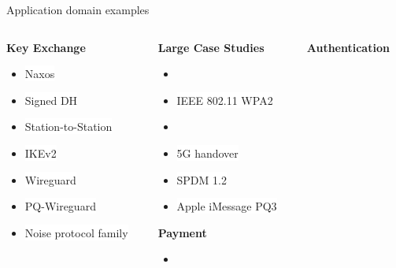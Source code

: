 \documentclass[11pt,aspectratio=169]{beamer}
\begin{document}
\begin{frame}[fragile]{Application domain examples}
    \begin{columns}
        \begin{column}{0.36\textwidth}
            \textbf{Key Exchange}
            \begin{itemize}
                \item \colorbox{white}{Naxos}
                \item \colorbox{white}{Signed DH}
                \item \colorbox{white}{Station-to-Station}
                \item \colorbox{white}{IKEv2}
                \item \colorbox{white}{Wireguard}
                \item \colorbox{white}{PQ-Wireguard}
                \item \colorbox{white}{Noise protocol family}
            \end{itemize}
        \end{column}
        \begin{column}{0.36\textwidth}
            \textbf{Large Case Studies}
            \begin{itemize}
                \item {}
                \item \colorbox{white}{IEEE 802.11 WPA2}
                \item {}
                \item \colorbox{white}{5G handover}
                \item \colorbox{white}{SPDM 1.2}
                \item \colorbox{white}{Apple iMessage PQ3}
            \end{itemize}
            \textbf{Payment}
            \begin{itemize}
                \item {}
            \end{itemize}
        \end{column}
        \begin{column}{0.3\textwidth}
            \textbf{Authentication}
            \begin{itemize}

\end{itemize}
\end{column}
\end{columns}
\end{frame}
\end{document}
